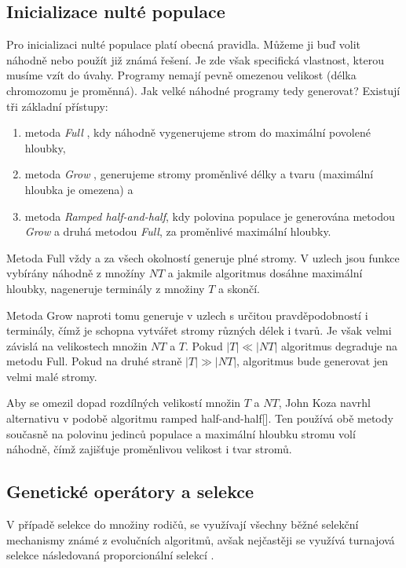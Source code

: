 \subsection{Inicializace nulté populace}

Pro inicializaci nulté populace platí obecná pravidla. Můžeme ji buď volit náhodně
nebo použít již známá řešení. Je zde však specifická vlastnost, kterou 
musíme vzít do úvahy. Programy nemají pevně omezenou velikost (délka
chromozomu je proměnná). Jak velké náhodné programy tedy generovat? Existují tři
základní přístupy:

\begin{enumerate}
	\item metoda \textit{Full} , kdy náhodně vygenerujeme strom do maximální povolené
		hloubky,
	\item metoda \textit{Grow} , generujeme stromy proměnlivé délky a tvaru (maximální
		hloubka je omezena) a
	\item metoda \textit{Ramped half-and-half}, kdy polovina populace je generována metodou
		\textit{Grow} a druhá metodou \textit{Full}, za proměnlivé maximální hloubky.
\end{enumerate}

Metoda Full vždy a za všech okolností generuje plné stromy. V uzlech jsou funkce
vybírány náhodně z množíny $NT$ a jakmile algoritmus dosáhne maximální hloubky,
nageneruje terminály z množiny $T$ a skončí.

Metoda Grow naproti tomu generuje v uzlech s určitou pravděpodobností i terminály, čímž
je schopna vytvářet stromy různých délek i tvarů. Je však velmi závislá na velikostech
množin $NT$ a $T$. Pokud $|T| \ll |NT|$ algoritmus degraduje na metodu Full. Pokud
na druhé straně $|T| \gg |NT|$, algoritmus bude generovat jen velmi malé stromy.

Aby se omezil dopad rozdílných velikostí množin $T$ a $NT$, John Koza navrhl alternativu
v podobě algoritmu ramped half-and-half[]. Ten používá obě metody současně na polovinu 
jedinců populace a maximální hloubku stromu volí náhodně, čímž zajišťuje proměnlivou
velikost i tvar stromů.

\subsection{Genetické operátory a selekce}

V případě selekce do množiny rodičů, se využívají všechny běžné selekční mechanismy
známé z evolučních algoritmů, avšak nejčastěji se využívá turnajová selekce následovaná
proporcionální selekcí \cite{GPTutorial}.

